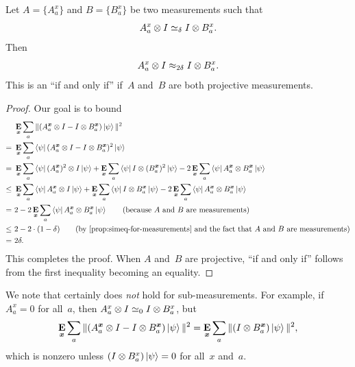 \begin{proposition}\label{prop:simeq-to-approx}
Let $A = \{A^x_a\}$ and $B = \{B^x_a\}$ be two measurements such that
\begin{equation*}
A^x_a \otimes I \simeq_{\delta} I \otimes B^x_a.
\end{equation*}
Then
\begin{equation*}
A^x_a \otimes I \approx_{2\delta} I \otimes B^x_a.
\end{equation*}
This is an ``if and only if'' if~$A$ and~$B$ are both projective measurements.
\end{proposition}
\begin{proof}
Our goal is to bound
\begin{align*}
&\E_{\bx} \sum_a\Vert (A^{\bx}_a \ot I - I \ot B^{\bx}_a) \ket{\psi} \Vert^2\\
=~&\E_{\bx} \sum_a \bra{\psi} (A^{\bx}_a \ot I - I \ot B^{\bx}_a)^2 \ket{\psi}\\
=~&\E_{\bx} \sum_a \bra{\psi} (A^{\bx}_a)^2 \ot I \ket{\psi}
	+\E_{\bx} \sum_a \bra{\psi} I \ot (B^{\bx}_a)^2 \ket{\psi}
	- 2 \E_{\bx} \sum_a \bra{\psi} A^{\bx}_a \ot B^{\bx}_a \ket{\psi}\\
\leq~&\E_{\bx} \sum_a \bra{\psi} A^{\bx}_a \ot I \ket{\psi}
	+\E_{\bx} \sum_a \bra{\psi} I \ot B^{\bx}_a \ket{\psi}
	- 2 \E_{\bx} \sum_a \bra{\psi} A^{\bx}_a \ot B^{\bx}_a \ket{\psi}\\
=~&2
	- 2 \E_{\bx} \sum_a \bra{\psi} A^{\bx}_a \ot B^{\bx}_a \ket{\psi} \tag{because~$A$ and~$B$ are measurements}\\
\leq~& 2 - 2 \cdot(1-\delta) \tag{by~\Cref{prop:simeq-for-measurements} and the fact that~$A$ and~$B$ are measurements}\\
=~&2 \delta.
\end{align*}
This completes the proof.
When  $A$ and~$B$ are projective, ``if and only if'' 
follows from the first inequality becoming an equality.
\end{proof}


\begin{remark}
We note that  certainly does \emph{not} hold for sub-measurements.
For example, if $A^x_a = 0$ for all~$a$,
then $A_a^x \otimes I \simeq_{0} I \otimes B_a^x$,
but
\begin{equation*}
\mathop{\bf E\/}_{{\boldsymbol{x}}} \sum_a \Vert (A^{{\boldsymbol{x}}}_a \otimes I - I \otimes B^{{\boldsymbol{x}}}_a)\ket{\psi} \Vert^2
= \mathop{\bf E\/}_{{\boldsymbol{x}}} \sum_a \Vert (I \otimes B^{{\boldsymbol{x}}}_a)\ket{\psi} \Vert^2,
\end{equation*}
which is nonzero unless $(I \otimes B^x_a) \ket{\psi} = 0$ for all~$x$ and~$a$.
\end{remark}


